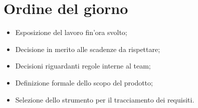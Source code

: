 \documentclass[../Riunione16-01-07.tex]{subfiles}
\begin{document}
\section{Ordine del giorno}
\begin{itemize}
	\item Esposizione del lavoro fin'ora svolto;
	\item Decisione in merito alle scadenze da rispettare;
	\item Decisioni riguardanti regole interne al team;
	\item Definizione formale dello scopo del prodotto;
	\item Selezione dello strumento per il tracciamento dei requisiti.
\end{itemize}
\end{document}

